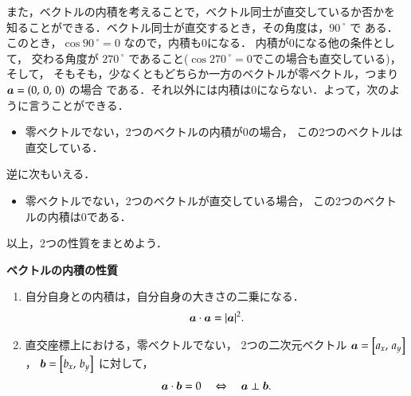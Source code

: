                また，ベクトルの内積を考えることで，ベクトル同士が直交しているか否かを
                知ることができる．ベクトル同士が直交するとき，その角度は，${90\,}^{\circ}$ で
                ある．このとき，$\cos{90\,}^{\circ} =0$ なので，内積も0になる．
                内積が0になる他の条件として，
                交わる角度が ${270\,}^{\circ}$ であること($\cos{270\,}^{\circ} =0$でこの場合も直交している)，そして，
                そもそも，少なくともどちらか一方のベクトルが零ベクトル，つまり $\boldsymbol{a} = ( 0,\,0,\,0 )$ の場合
                である．それ以外には内積は0にならない．よって，次のように言うことができる．
                    \begin{itemize}
                        \item 零ベクトルでない，2つのベクトルの内積が0の場合，
                        この2つのベクトルは直交している．
                    \end{itemize}
                逆に次もいえる．
                    \begin{itemize}
                        \item 零ベクトルでない，2つのベクトルが直交している場合，
                        この2つのベクトルの内積は0である．
                    \end{itemize}

                以上，2つの性質をまとめよう．\\

                    \begin{itembox}[l]{\textbf{ベクトルの内積の性質}}
                        \begin{enumerate}
                            \item 自分自身との内積は，自分自身の大きさの二乗になる．
                                \begin{align}
                                     \boldsymbol{a}\cdot\boldsymbol{a} = |\boldsymbol{a}|^{2} .
                                \end{align}

                            \item 直交座標上における，零ベクトルでない，
                            2つの二次元ベクトル $\boldsymbol{a} =\left[a_{x} ,\,a_{y}\right]$，
                            $\boldsymbol{b} = \left[b_{x} ,\,b_{y}\right]$ に対して，
                                \begin{align}
                                    \boldsymbol{a} \cdot \boldsymbol{b} = 0 \quad  \Leftrightarrow \quad  \boldsymbol{a} \perp \boldsymbol{b}.
                                \end{align}
                        \end{enumerate}
                    \end{itembox}


